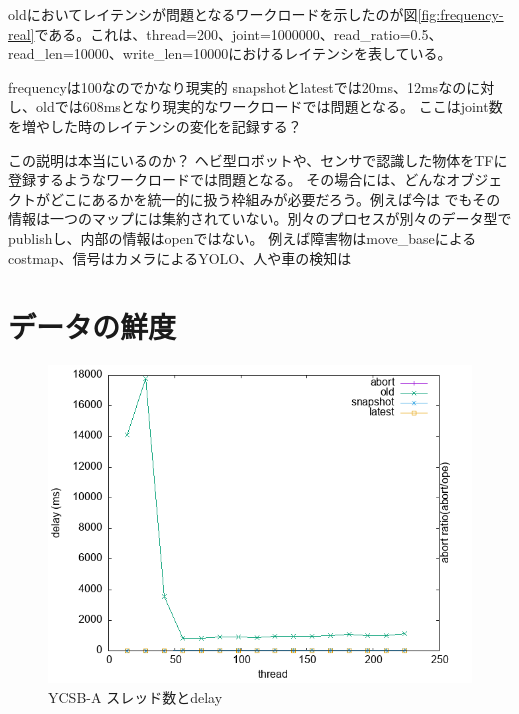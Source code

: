 \documentclass[a4paper]{jreport}	%
\begin{document}

oldにおいてレイテンシが問題となるワークロードを示したのが図\ref{fig:frequency-real}である。これは、thread=200、joint=1000000、read\_ratio=0.5、read\_len=10000、write\_len=10000におけるレイテンシを表している。

frequencyは100なのでかなり現実的
snapshotとlatestでは20ms、12msなのに対し、oldでは608msとなり現実的なワークロードでは問題となる。
ここはjoint数を増やした時のレイテンシの変化を記録する？

この説明は本当にいるのか？
ヘビ型ロボットや、センサで認識した物体をTFに登録するようなワークロードでは問題となる。
その場合には、どんなオブジェクトがどこにあるかを統一的に扱う枠組みが必要だろう。例えば今は
でもその情報は一つのマップには集約されていない。別々のプロセスが別々のデータ型でpublishし、内部の情報はopenではない。
例えば障害物はmove\_baseによるcostmap、信号はカメラによるYOLO、人や車の検知は


\section{データの鮮度}


\begin{figure}[h] 
\centering
\includegraphics[width=15cm]{data/stable/ycsb-a/delay}
\caption{YCSB-A スレッド数とdelay}
\label{fig:delay-a}
\end{figure}
\end{document}
